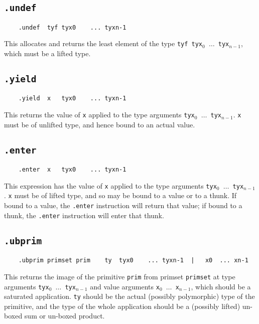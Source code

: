 \documentclass{report}
\newcommand\stringcode[1]{\texttt{#1}}
\begin{document}
\subsection{\stringcode{.undef}}

\begin{verbatim}
	.undef	tyf	tyx0	...	tyxn-1
\end{verbatim}

This allocates and returns the least element of the type \stringcode{tyf tyx$_0$ $\ldots$ tyx$_{n-1}$}, which must be a lifted type.

\subsection{\stringcode{.yield}}

\begin{verbatim}
	.yield	x	tyx0	...	tyxn-1
\end{verbatim}

This returns the value of \stringcode{x} applied to the type arguments \stringcode{tyx$_0$ $\ldots$ tyx$_{n-1}$}.
\stringcode{x} must be of unlifted type, and hence bound to an actual value.

\subsection{\stringcode{.enter}}

\begin{verbatim}
	.enter	x	tyx0	...	tyxn-1
\end{verbatim}

This expression has the value of \stringcode{x} applied to the type arguments \stringcode{tyx$_0$ $\ldots$ tyx$_{n-1}$}.
\stringcode{x} must be of lifted type, and so may be bound to a value or to a thunk.
If bound to a value, the \stringcode{.enter} instruction will return that value;
if bound to a thunk, the \stringcode{.enter} instruction will enter that thunk.

\subsection{\stringcode{.ubprim}}

\begin{verbatim}
	.ubprim	primset	prim	ty	tyx0	...	tyxn-1	|	x0	...	xn-1
\end{verbatim}

This returns the image of the primitive \stringcode{prim} from primset \stringcode{primset} at type arguments \stringcode{tyx$_0$ $\ldots$ tyx$_{n-1}$} and value arguments \stringcode{x$_0$ $\ldots$ x$_{n-1}$},
which should be a saturated application.
\stringcode{ty} should be the actual (possibly polymorphic) type of the primitive,
and the type of the whole application should be a (possibly lifted) un-boxed sum or un-boxed product.
\end{document}
